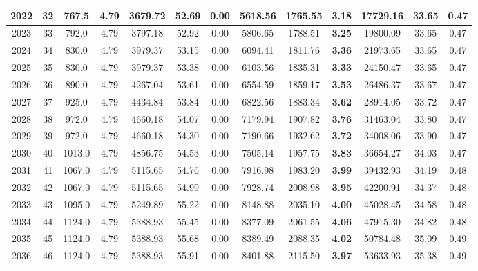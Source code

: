 {\begin{center}
\begin{tabular}[htb]{|c|c||c|c|c|c|c|c||c|c||c|c|c||}
\hline 
 2022 &  32 &  767.5 &  4.79 &  3679.72 &  52.69 &  0.00 &  5618.56 &  1765.55 &  {\bf 3.18} &  17729.16 &  33.65 &  0.47 \\ 
\hline 
 2023 &  33 &  792.0 &  4.79 &  3797.18 &  52.92 &  0.00 &  5806.65 &  1788.51 &  {\bf 3.25} &  19800.09 &  33.65 &  0.47 \\ 
\hline 
 2024 &  34 &  830.0 &  4.79 &  3979.37 &  53.15 &  0.00 &  6094.41 &  1811.76 &  {\bf 3.36} &  21973.65 &  33.65 &  0.47 \\ 
\hline 
 2025 &  35 &  830.0 &  4.79 &  3979.37 &  53.38 &  0.00 &  6103.56 &  1835.31 &  {\bf 3.33} &  24150.47 &  33.65 &  0.47 \\ 
\hline 
 2026 &  36 &  890.0 &  4.79 &  4267.04 &  53.61 &  0.00 &  6554.59 &  1859.17 &  {\bf 3.53} &  26486.37 &  33.67 &  0.47 \\ 
\hline 
 2027 &  37 &  925.0 &  4.79 &  4434.84 &  53.84 &  0.00 &  6822.56 &  1883.34 &  {\bf 3.62} &  28914.05 &  33.72 &  0.47 \\ 
\hline 
 2028 &  38 &  972.0 &  4.79 &  4660.18 &  54.07 &  0.00 &  7179.94 &  1907.82 &  {\bf 3.76} &  31463.04 &  33.80 &  0.47 \\ 
\hline 
 2029 &  39 &  972.0 &  4.79 &  4660.18 &  54.30 &  0.00 &  7190.66 &  1932.62 &  {\bf 3.72} &  34008.06 &  33.90 &  0.47 \\ 
\hline 
 2030 &  40 &  1013.0 &  4.79 &  4856.75 &  54.53 &  0.00 &  7505.14 &  1957.75 &  {\bf 3.83} &  36654.27 &  34.03 &  0.47 \\ 
\hline 
 2031 &  41 &  1067.0 &  4.79 &  5115.65 &  54.76 &  0.00 &  7916.98 &  1983.20 &  {\bf 3.99} &  39432.93 &  34.19 &  0.48 \\ 
\hline 
 2032 &  42 &  1067.0 &  4.79 &  5115.65 &  54.99 &  0.00 &  7928.74 &  2008.98 &  {\bf 3.95} &  42200.91 &  34.37 &  0.48 \\ 
\hline 
 2033 &  43 &  1095.0 &  4.79 &  5249.89 &  55.22 &  0.00 &  8148.88 &  2035.10 &  {\bf 4.00} &  45028.45 &  34.58 &  0.48 \\ 
\hline 
 2034 &  44 &  1124.0 &  4.79 &  5388.93 &  55.45 &  0.00 &  8377.09 &  2061.55 &  {\bf 4.06} &  47915.30 &  34.82 &  0.48 \\ 
\hline 
 2035 &  45 &  1124.0 &  4.79 &  5388.93 &  55.68 &  0.00 &  8389.49 &  2088.35 &  {\bf 4.02} &  50784.48 &  35.09 &  0.49 \\ 
\hline 
 2036 &  46 &  1124.0 &  4.79 &  5388.93 &  55.91 &  0.00 &  8401.88 &  2115.50 &  {\bf 3.97} &  53633.93 &  35.38 &  0.49 \\ 

\end{tabular}
\end{center}}
